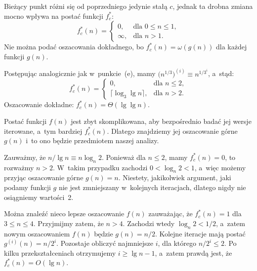 \subexercise{} %
Bieżący punkt różni się od poprzedniego jedynie stałą $c$, jednak ta drobna zmiana mocno wpływa na postać funkcji $f_c^*$:
\[
	f_c^*(n) =
	\begin{cases}
		0, & \text{dla $0\le n\le1$}, \\
		\infty, & \text{dla $n>1$}.
	\end{cases}
\]
Nie można podać oszacowania dokładnego, bo $f_c^*(n)=\omega(g(n))$ dla każdej funkcji $g(n)$.

\subexercise{} %
Postępując analogicznie jak w~punkcie~(e), mamy $\bigl(n^{1/3}\bigr)^{(i)}\equiv n^{1/3^i}$, a~stąd:
\[
	f_c^*(n) =
	\begin{cases}
		0, & \text{dla $n\le2$}, \\
		\lceil\log_3\lg n\rceil, & \text{dla $n>2$}.
	\end{cases}
\]
Oszacowanie dokładne: $f_c^*(n)=\Theta(\lg\lg n)$.

\subexercise{} %
Postać funkcji $f(n)$ jest zbyt skomplikowana, aby bezpośrednio badać jej wersje iterowane, a~tym bardziej $f_c^*(n)$. Dlatego znajdziemy jej oszacowanie górne $g(n)$ i~to ono będzie przedmiotem naszej analizy.

Zauważmy, że $n/\!\lg n\equiv n\log_n\!2$. Ponieważ dla $n\le2$, mamy $f_c^*(n)=0$, to rozważmy $n>2$. W~takim przypadku zachodzi $0<\log_n\!2<1$, a~więc możemy przyjąc oszacowanie górne $g(n)=n$. Niestety, jakikolwiek argument, jaki podamy funkcji $g$ nie jest zmniejszany w~kolejnych iteracjach, dlatego nigdy nie osiągniemy wartości~2.

Można znaleźć nieco lepsze oszacowanie $f(n)$ zauważając, że $f_c^*(n)=1$ dla $3\le n\le4$. Przyjmijmy zatem, że $n>4$. Zachodzi wtedy $\log_n\!2<1/2$, a~zatem nowym oszacowaniem $f(n)$ będzie $g(n)=n/2$. Kolejne iteracje mają postać $g^{(i)}(n)=n/2^i$. Pozostaje obliczyć najmniejsze $i$, dla którego $n/2^i\le2$. Po kilku przekształceniach otrzymujemy $i\ge\lg n-1$, a~zatem prawdą jest, że $f_c^*(n)=O(\lg n)$.

\endinput
